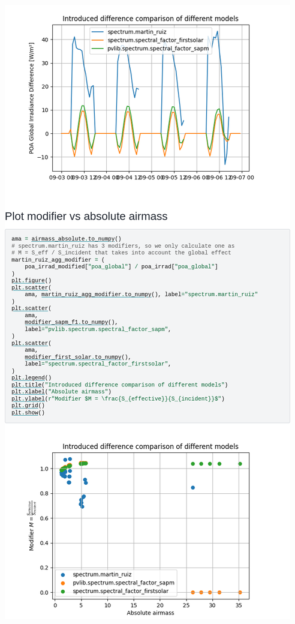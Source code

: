 \begin{myparindent}{0pt}
\includegraphics[width=\linewidth,height=0.9\textheight,keepaspectratio]{images/docs_examples_cut/mr_3.png}


\end{myparindent}
